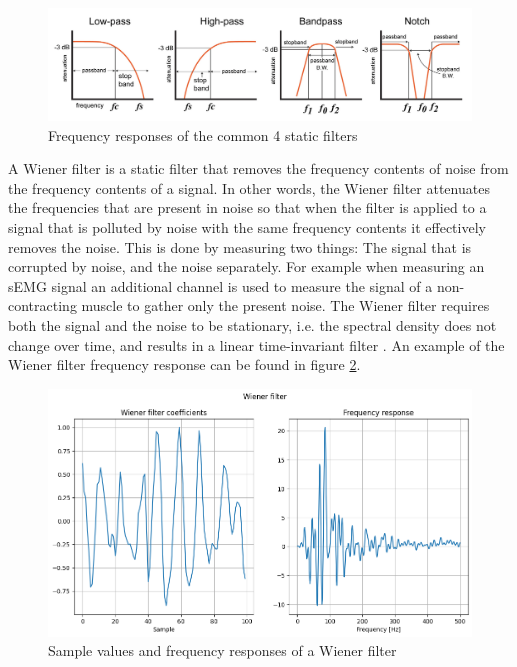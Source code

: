 \begin{figure}[h!t]
	\begin{center}
		\includegraphics[width=1.0\columnwidth]{images/Davis_intro_to_filters_filter_types.png}
	\end{center}
	\caption{Frequency responses of the common 4 static filters \cite{intro_to_static_filters}}
	\label{fig:static_filters}
\end{figure}

A Wiener filter is a static filter that removes the frequency contents of noise from the frequency contents of a signal. In other words, the Wiener filter attenuates the frequencies that are present in noise so that when the filter is applied to a signal that is polluted by noise with the same frequency contents it effectively removes the noise. This is done by measuring two things: The signal that is corrupted by noise, and the noise separately. For example when measuring an sEMG signal an additional channel is used to measure the signal of a non-contracting muscle to gather only the present noise.
The Wiener filter requires both the signal and the noise to be stationary, i.e. the spectral density does not change over time, and results in a linear time-invariant filter \cite{wiki:Stationary_process} \cite{difference_stationary_nonstationary}. An example of the Wiener filter frequency response can be found in figure \ref{fig:wiener_filter_response}.

\begin{figure}[h!t]
	\begin{center}
		\includegraphics[width=1.0\columnwidth]{images/wiener_filter_response.png}
	\end{center}
	\caption{Sample values and frequency responses of a Wiener filter}
	\label{fig:wiener_filter_response}
\end{figure}

